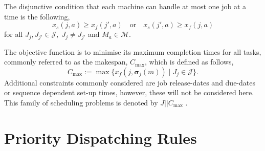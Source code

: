\documentclass[smallextended]{svjour3}
\renewcommand{\vsigma}{\bm \sigma}
\begin{document}
The disjunctive condition that each machine can handle at most one job at a 
time is the following,
\begin{equation}\label{eq:oneJobPerMac}
x_s(j,a) \geq x_f(j',a) \quad\textrm{or}\quad x_s(j',a) \geq x_f(j,a)  
\end{equation}
for all $J_j,J_{j'}\in\mathcal{J},\; J_j\neq J_{j'}$ and $M_a\in\mathcal{M}$. 

The objective function is to minimise its maximum completion times for all 
tasks, commonly referred to as the makespan, $C_{\max}$, which is defined as 
follows,
\begin{equation}
C_{\max} := 
\max\{x_f(j,\vsigma_j(m))\;|\;J_j\in\mathcal{J}\}.\label{eq:makespan}
\end{equation} 
Additional constraints commonly considered are job release-dates and due-dates 
or sequence dependent set-up times, however, these will not be considered here. 
This family of scheduling problems is denoted by $J||C_{\max}$ 
\citep{Pinedo08}.  



\section{Priority Dispatching Rules} \label{sec:constructionjssp}
\end{document}

